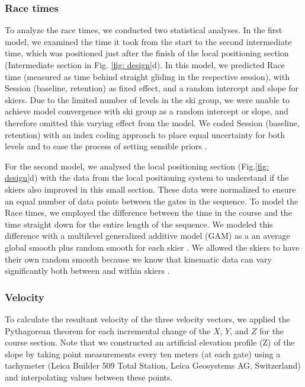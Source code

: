 \documentclass{article}
\begin{document}
\subsubsection{Race times}
To analyze the race times, we conducted two statistical analyses. In the first model, we examined the time it took from the start to the second intermediate time, which was positioned just after the finish of the local positioning section (Intermediate section in Fig. \ref{fig: design}d). In this model, we predicted Race time (measured as time behind straight gliding in the respective session), with Session (baseline, retention) as fixed effect, and a random intercept and slope for skiers. Due to the limited number of levels in the ski group, we were unable to achieve model convergence with ski group as a random intercept or slope, and therefore omitted this varying effect from the model. We coded Session (baseline, retention) with an index coding approach to place equal uncertainty for both levels and to ease the process of setting sensible priors \cite{mcelreath_statistical_2018}.

For the second model, we analysed the local positioning section (Fig.\ref{fig: design}d) with the data from the local positioning system to understand if the skiers also improved in this small section. These data were normalized to ensure an equal number of data points between the gates in the sequence. To model the Race times, we employed the difference between the time in the course and the time straight down for the entire length of the sequence. We modeled this difference with a multilevel generalized additive model (GAM) as a an average global smooth plus random smooth for each skier \cite{pedersen_hierarchical_2019}. We allowed the skiers to have their own random smooth because we know that kinematic data can vary significantly both between and within skiers \cite{federolf_quantifying_2012, supej_impact_2015, reid_kinematic_2010}.

\subsubsection{Velocity}
To calculate the resultant velocity of the three velocity vectors, we applied the Pythagorean theorem for each incremental change of the $X$, $Y$, and $Z$ for the course section. Note that we constructed an artificial elevation profile (Z) of the slope by taking point measurements every ten meters (at each gate) using a tachymeter (Leica Builder 509 Total Station, Leica Geosystems AG, Switzerland) and interpolating values between these points. 
\end{document}
